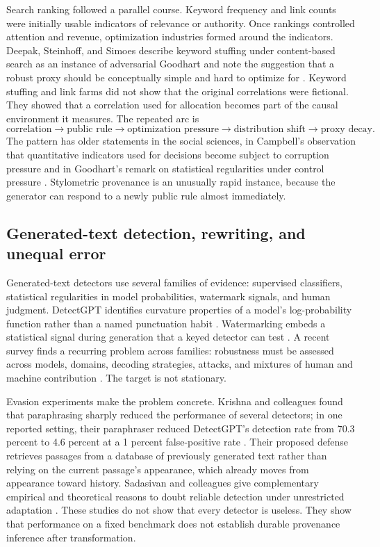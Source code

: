 \documentclass[11pt]{article}
\theoremstyle{plain}
\theoremstyle{definition}
\theoremstyle{remark}
\begin{document}
Search ranking followed a parallel course. Keyword frequency and link counts were initially usable indicators of relevance or authority. Once rankings controlled attention and revenue, optimization industries formed around the indicators. Deepak, Steinhoff, and Simoes describe keyword stuffing under content-based search as an instance of adversarial Goodhart and note the suggestion that a robust proxy should be conceptually simple and hard to optimize for \cite{deepak2024}. Keyword stuffing and link farms did not show that the original correlations were fictional. They showed that a correlation used for allocation becomes part of the causal environment it measures. The repeated arc is
\[
\text{correlation}
\longrightarrow
\text{public rule}
\longrightarrow
\text{optimization pressure}
\longrightarrow
\text{distribution shift}
\longrightarrow
\text{proxy decay}.
\]
The pattern has older statements in the social sciences, in Campbell's observation that quantitative indicators used for decisions become subject to corruption pressure \cite{campbell1979} and in Goodhart's remark on statistical regularities under control pressure \cite{goodhart1984}. Stylometric provenance is an unusually rapid instance, because the generator can respond to a newly public rule almost immediately.

\subsection{Generated-text detection, rewriting, and unequal error}

Generated-text detectors use several families of evidence: supervised classifiers, statistical regularities in model probabilities, watermark signals, and human judgment. DetectGPT identifies curvature properties of a model's log-probability function rather than a named punctuation habit \cite{mitchell2023}. Watermarking embeds a statistical signal during generation that a keyed detector can test \cite{kirchenbauer2023}. A recent survey finds a recurring problem across families: robustness must be assessed across models, domains, decoding strategies, attacks, and mixtures of human and machine contribution \cite{wu2025}. The target is not stationary.

Evasion experiments make the problem concrete. Krishna and colleagues found that paraphrasing sharply reduced the performance of several detectors; in one reported setting, their paraphraser reduced DetectGPT's detection rate from 70.3 percent to 4.6 percent at a 1 percent false-positive rate \cite{krishna2023}. Their proposed defense retrieves passages from a database of previously generated text rather than relying on the current passage's appearance, which already moves from appearance toward history. Sadasivan and colleagues give complementary empirical and theoretical reasons to doubt reliable detection under unrestricted adaptation \cite{sadasivan2023}. These studies do not show that every detector is useless. They show that performance on a fixed benchmark does not establish durable provenance inference after transformation.
\end{document}
